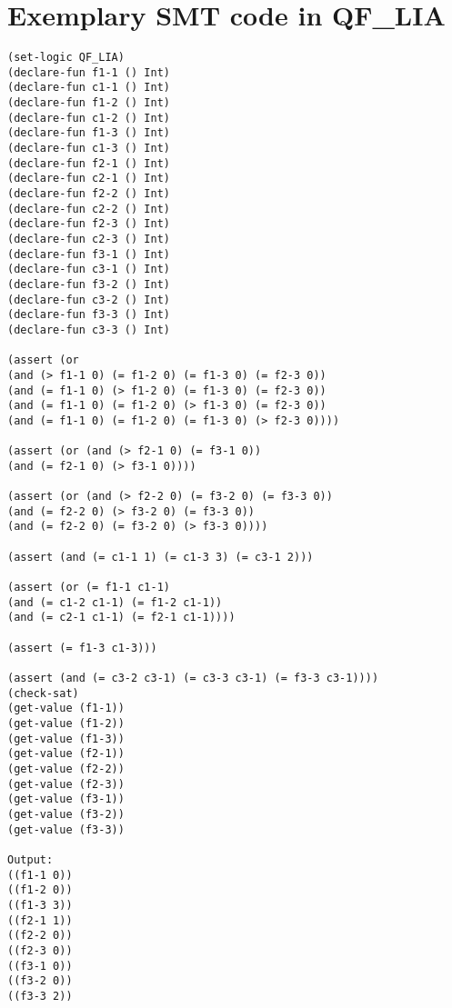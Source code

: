 \chapter{Exemplary SMT code in QF_LIA}
\begin{lstlisting}
(set-logic QF_LIA)
(declare-fun f1-1 () Int)
(declare-fun c1-1 () Int)
(declare-fun f1-2 () Int)
(declare-fun c1-2 () Int)
(declare-fun f1-3 () Int)
(declare-fun c1-3 () Int)
(declare-fun f2-1 () Int)
(declare-fun c2-1 () Int)
(declare-fun f2-2 () Int)
(declare-fun c2-2 () Int)
(declare-fun f2-3 () Int)
(declare-fun c2-3 () Int)
(declare-fun f3-1 () Int)
(declare-fun c3-1 () Int)
(declare-fun f3-2 () Int)
(declare-fun c3-2 () Int)
(declare-fun f3-3 () Int)
(declare-fun c3-3 () Int)

(assert (or 
(and (> f1-1 0) (= f1-2 0) (= f1-3 0) (= f2-3 0)) 
(and (= f1-1 0) (> f1-2 0) (= f1-3 0) (= f2-3 0)) 
(and (= f1-1 0) (= f1-2 0) (> f1-3 0) (= f2-3 0)) 
(and (= f1-1 0) (= f1-2 0) (= f1-3 0) (> f2-3 0))))

(assert (or (and (> f2-1 0) (= f3-1 0)) 
(and (= f2-1 0) (> f3-1 0))))

(assert (or (and (> f2-2 0) (= f3-2 0) (= f3-3 0)) 
(and (= f2-2 0) (> f3-2 0) (= f3-3 0)) 
(and (= f2-2 0) (= f3-2 0) (> f3-3 0))))

(assert (and (= c1-1 1) (= c1-3 3) (= c3-1 2)))

(assert (or (= f1-1 c1-1) 
(and (= c1-2 c1-1) (= f1-2 c1-1)) 
(and (= c2-1 c1-1) (= f2-1 c1-1))))

(assert (= f1-3 c1-3)))

(assert (and (= c3-2 c3-1) (= c3-3 c3-1) (= f3-3 c3-1))))
(check-sat)
(get-value (f1-1))
(get-value (f1-2))
(get-value (f1-3))
(get-value (f2-1))
(get-value (f2-2))
(get-value (f2-3))
(get-value (f3-1))
(get-value (f3-2))
(get-value (f3-3))

Output:
((f1-1 0))
((f1-2 0))
((f1-3 3))
((f2-1 1))
((f2-2 0))
((f2-3 0))
((f3-1 0))
((f3-2 0))
((f3-3 2))
\end{lstlisting}


